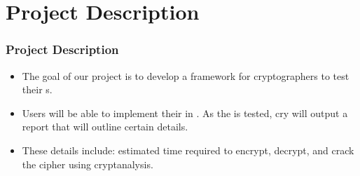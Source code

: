 \section{Project Description}


\begin{frame}
\frametitle{Project Description}
\begin{itemize}
\item The goal of our project is to develop a framework for
  cryptographers to test their \cs s.
\item Users will be able to implement their
  \cs{} in \cry. As the \cs{} is tested, cry will
  output a report that will outline certain details.
\item These details include: estimated time required to
  encrypt, decrypt, and crack the cipher using
  cryptanalysis.
\end{itemize}
\end{frame}
